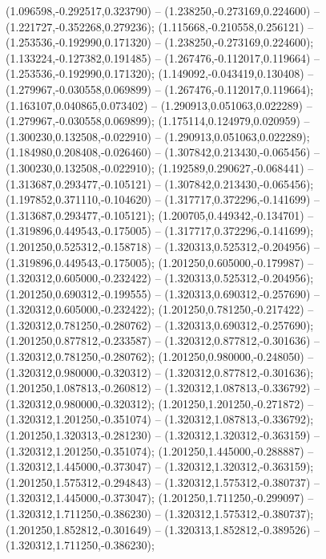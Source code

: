  (1.096598,-0.292517,0.323790) -- (1.238250,-0.273169,0.224600) -- (1.221727,-0.352268,0.279236);
 (1.115668,-0.210558,0.256121) -- (1.253536,-0.192990,0.171320) -- (1.238250,-0.273169,0.224600);
 (1.133224,-0.127382,0.191485) -- (1.267476,-0.112017,0.119664) -- (1.253536,-0.192990,0.171320);
 (1.149092,-0.043419,0.130408) -- (1.279967,-0.030558,0.069899) -- (1.267476,-0.112017,0.119664);
 (1.163107,0.040865,0.073402) -- (1.290913,0.051063,0.022289) -- (1.279967,-0.030558,0.069899);
 (1.175114,0.124979,0.020959) -- (1.300230,0.132508,-0.022910) -- (1.290913,0.051063,0.022289);
 (1.184980,0.208408,-0.026460) -- (1.307842,0.213430,-0.065456) -- (1.300230,0.132508,-0.022910);
 (1.192589,0.290627,-0.068441) -- (1.313687,0.293477,-0.105121) -- (1.307842,0.213430,-0.065456);
 (1.197852,0.371110,-0.104620) -- (1.317717,0.372296,-0.141699) -- (1.313687,0.293477,-0.105121);
 (1.200705,0.449342,-0.134701) -- (1.319896,0.449543,-0.175005) -- (1.317717,0.372296,-0.141699);
 (1.201250,0.525312,-0.158718) -- (1.320313,0.525312,-0.204956) -- (1.319896,0.449543,-0.175005);
 (1.201250,0.605000,-0.179987) -- (1.320312,0.605000,-0.232422) -- (1.320313,0.525312,-0.204956);
 (1.201250,0.690312,-0.199555) -- (1.320313,0.690312,-0.257690) -- (1.320312,0.605000,-0.232422);
 (1.201250,0.781250,-0.217422) -- (1.320312,0.781250,-0.280762) -- (1.320313,0.690312,-0.257690);
 (1.201250,0.877812,-0.233587) -- (1.320312,0.877812,-0.301636) -- (1.320312,0.781250,-0.280762);
 (1.201250,0.980000,-0.248050) -- (1.320312,0.980000,-0.320312) -- (1.320312,0.877812,-0.301636);
 (1.201250,1.087813,-0.260812) -- (1.320312,1.087813,-0.336792) -- (1.320312,0.980000,-0.320312);
 (1.201250,1.201250,-0.271872) -- (1.320312,1.201250,-0.351074) -- (1.320312,1.087813,-0.336792);
 (1.201250,1.320313,-0.281230) -- (1.320312,1.320312,-0.363159) -- (1.320312,1.201250,-0.351074);
 (1.201250,1.445000,-0.288887) -- (1.320312,1.445000,-0.373047) -- (1.320312,1.320312,-0.363159);
 (1.201250,1.575312,-0.294843) -- (1.320312,1.575312,-0.380737) -- (1.320312,1.445000,-0.373047);
 (1.201250,1.711250,-0.299097) -- (1.320312,1.711250,-0.386230) -- (1.320312,1.575312,-0.380737);
 (1.201250,1.852812,-0.301649) -- (1.320313,1.852812,-0.389526) -- (1.320312,1.711250,-0.386230);
